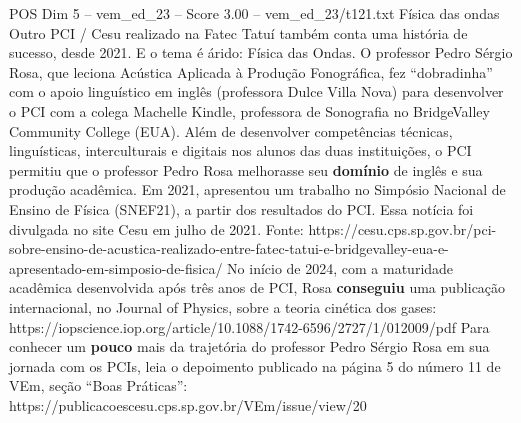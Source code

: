 \begin{textsample}{POS Dim 5 – vem\_ed\_23 – Score 3.00 – vem\_ed\_23/t121.txt}  \label{ex:f5_pos_064}
Física das ondas Outro PCI / Cesu realizado na Fatec Tatuí também conta uma história de sucesso, desde 2021.
E o tema é árido: Física das Ondas.
O professor Pedro Sérgio Rosa, que leciona Acústica Aplicada à Produção Fonográfica, fez “dobradinha” com o apoio linguístico em inglês (professora Dulce Villa Nova) para desenvolver o PCI com a colega Machelle Kindle, professora de Sonografia no BridgeValley Community College (EUA).
Além de desenvolver competências técnicas, linguísticas, interculturais e digitais nos alunos das duas instituições, o PCI permitiu que o professor Pedro Rosa melhorasse seu \textbf{domínio} de inglês e sua produção acadêmica.
Em 2021, apresentou um trabalho no Simpósio Nacional de Ensino de Física (SNEF21), a partir dos resultados do PCI.
Essa notícia foi divulgada no site Cesu em julho de 2021.
Fonte: https://cesu.cps.sp.gov.br/pci-sobre-ensino-de-acustica-realizado-entre-fatec-tatui-e-bridgevalley-eua-e-apresentado-em-simposio-de-fisica/ No início de 2024, com a maturidade acadêmica desenvolvida após três anos de PCI, Rosa \textbf{conseguiu} uma publicação internacional, no Journal of Physics, sobre a teoria cinética dos gases: https://iopscience.iop.org/article/10.1088/1742-6596/2727/1/012009/pdf Para conhecer um \textbf{pouco} mais da trajetória do professor Pedro Sérgio Rosa em sua jornada com os PCIs, leia o depoimento publicado na página 5 do número 11 de VEm, seção “Boas Práticas”: https://publicacoescesu.cps.sp.gov.br/VEm/issue/view/20

\end{textsample}
